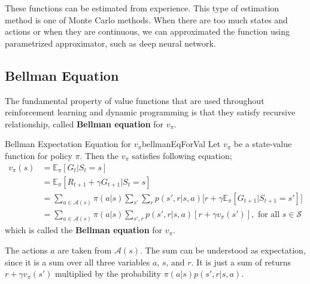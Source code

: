 \documentclass[../../main.tex]{subfiles}
\begin{document}
        These functions can be estimated from experience. This type of estimation method is one of Monte Carlo methods.
        When there are too much states and actions or when they are continuous, we can approximated the function using parametrized approximator, such as deep neural network.
    
    \subsection{Bellman Equation}
        The fundamental property of value functions that are used throughout reinforcement learning and dynamic programming is that they satisfy recursive relationship,
        called \textbf{Bellman equation} for $v_\pi$.
        \begin{thm}{Bellman Expectation Equation for $v_\pi$}{bellmanEqForVal}
            Let $v_\pi$ be a state-value function for policy $\pi$. Then the $v_\pi$ satisfies following equation;
            \begin{align}
                v_\pi(s) &= \mathbb{E}_\pi[G_t|S_t=s]
                \\ &= \mathbb{E}_\pi[R_{t+1} + \gamma G_{t+1} | S_t = s]
                \\ &= \sum_{a \in \mathcal{A}(s)} \pi(a|s)\sum_{s'}\sum_rp(s',r|s,a)\big[r + \gamma\mathbb{E}_\pi[G_{t+1}|S_{t+1}=s'] \big]
                \\ &= \sum_{a \in \mathcal{A}(s)} \pi(a|s)\sum_{s', r}p(s',r|s,a)[r + \gamma v_\pi(s')], \text{ for all } s \in \mathcal{S}
            \end{align}
            which is called the \textbf{Bellman equation} for $v_\pi$.
        \end{thm}
        The actions $a$ are taken from $\mathcal{A}(s)$. The sum can be understood as expectation, since it is a sum over all
        three variables $a$, $s$, and $r$. It is just a sum of returns $r + \gamma v_\pi(s')$ multiplied by the probability $\pi(a|s)p(s',r|s,a)$.
\end{document}
